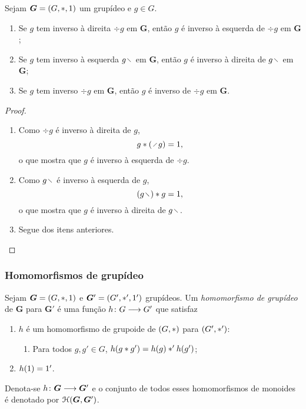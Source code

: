 \begin{proposition}
Sejam $\bm G = (G,\ast,1)$ um grupídeo e $g \in G$.
	\begin{enumerate}
		\item Se $g$ tem inverso à direita $\div g$ em $\bm G$, então $g$ é inverso à esquerda de $\div g$ em $\bm G$;
		\item Se $g$ tem inverso à esquerda $g \vid$ em $\bm G$, então $g$ é inverso à direita de $g \vid$ em $\bm G$;
		\item Se $g$ tem inverso $\div g$ em $\bm G$, então $g$ é inverso de $\div g$ em $\bm G$.
	\end{enumerate}
\end{proposition}
\begin{proof}
	\begin{enumerate}
	\item Como $\div g$ é inverso à direita de $g$,
		\begin{equation*}
		g \opb (\div g) = \id,
		\end{equation*}
	o que mostra que $g$ é inverso à esquerda de $\div g$.
	\item Como $g \vid$ é inverso à esquerda de $g$,
		\begin{equation*}
		(g \vid) \opb g = \id,
		\end{equation*}
	o que mostra que $g$ é inverso à direita de $g \vid$.
	\item Segue dos itens anteriores.
	\qedhere
	\end{enumerate}
\end{proof}

\subsubsection{Homomorfismos de grupídeo}

\begin{definition}
Sejam $\bm G=(G,\ast,1)$ e $\bm G'=(G',\ast',1')$ grupídeos. Um \emph{homomorfismo de grupídeo} de $\bm G$ para $\bm G'$ é uma função ${h}\colon {G} \longrightarrow {G'}$ que satisfaz
	\begin{enumerate}
	\item $h$ é um homomorfismo de grupoide de $(G,\ast)$ para $(G',\ast')$:
		\begin{enumerate}
		\item Para todos $g,g' \in G$, $h(g \ast g') = h(g) \ast' h(g')$;
		\end{enumerate}
	\item $h(1)=1'$.
	\end{enumerate}
Denota-se ${h}\colon {\bm G} \longrightarrow {\bm G'}$ e o conjunto de todos esses homomorfismos de monoides é denotado por $\mathcal{H}(\bm G,\bm G')$.
\end{definition}

